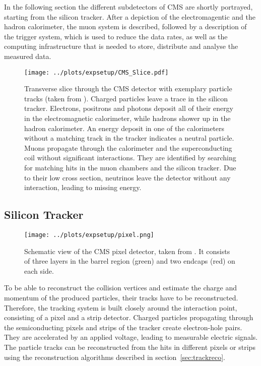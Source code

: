 \noindent In the following section the different subdetectors of CMS are shortly portrayed, starting from the silicon tracker. After a depiction of the electromagentic and the hadron calorimeter, the muon system is described, followed by a description of the trigger system, which is used to reduce the data rates, as well as the computing infrastructure that is needed to store, distribute and analyse the measured data.
\begin{figure}
	\centering
	\texttt{[image: ../plots/expsetup/CMS\_Slice.pdf]}
	\caption[Transverse slice through the CMS detector]{Transverse slice through the CMS detector with exemplary particle tracks (taken from \cite{cms_slice}). Charged particles leave a trace in the silicon tracker. Electrons, positrons and photons deposit all of their energy in the electromagnetic calorimeter, while hadrons shower up in the hadron calorimeter. An energy deposit in one of the calorimeters without a matching track in the tracker indicates a neutral particle. Muons propagate through the calorimeter and the superconducting coil without significant interactions. They are identified by searching for matching hits in the muon chambers and the silicon tracker. Due to their low cross section, neutrinos leave the detector without any interaction, leading to missing energy.}
	\label{fig:expsetup:cms_slice}
\end{figure}
\subsection*{Silicon Tracker}
\begin{figure}
	\centering
	\texttt{[image: ../plots/expsetup/pixel.png]}
	\caption[Schematic view of the CMS pixel detector]{Schematic view of the CMS pixel detector, taken from \cite{CMS_design}. It consists of three layers in the barrel region (green) and two endcaps (red) on each side.}
	\label{fig:expsetup:pixel}
\end{figure}
To be able to reconstruct the collision vertices and estimate the charge and momentum of the produced particles, their tracks have to be reconstructed. Therefore, the tracking system is built closely around the interaction point, consisting of a pixel and a strip detector. Charged particles propagating through the semiconducting pixels and strips of the tracker create electron-hole pairs. They are accelerated by an applied voltage, leading to measurable electric signals. The particle tracks can be reconstructed from the hits in different pixels or strips using the reconstruction algorithms described in section~\ref{sec:trackreco}.\\

